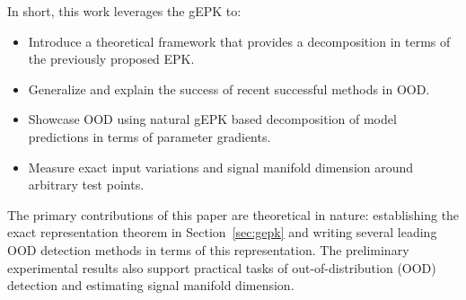 

In short, this work leverages the gEPK to:
\begin{itemize}
    \item Introduce a theoretical framework that provides a decomposition in terms of the previously proposed EPK. %
    \item Generalize and explain the success of recent successful methods in OOD.
    \item Showcase OOD using natural gEPK based decomposition of model predictions in terms of parameter gradients.
    \item Measure exact input variations and signal manifold dimension around arbitrary test points.

\end{itemize}
The primary contributions of this paper are theoretical in nature: establishing the exact representation theorem in Section~\ref{sec:gepk} and writing several leading OOD detection methods in terms of this representation. The preliminary experimental results also support practical tasks of out-of-distribution (OOD) detection and estimating signal manifold dimension. 

\label{sec:input}




